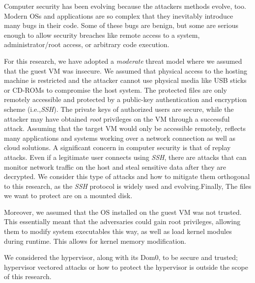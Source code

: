 Computer security has been evolving because the attackers methods evolve, too. Modern \acp{OS} and applications are so complex that they inevitably introduce many bugs in their code. Some of these bugs are benign, but some are serious enough to allow security breaches like remote access to a system, administrator/root access, or arbitrary code execution.

\par For this research, we have adopted a \emph{moderate} threat model where we assumed that the guest \ac{VM} was insecure. We assumed that physical access to the hosting machine is restricted and the attacker cannot use physical media like USB sticks or CD-ROMs to compromise the host system. The protected files are only remotely accessible and protected  by  a  public-key  authentication  and  encryption scheme (i.e.,\emph{SSH}). The  private  keys  of  authorized  users  are  secure, while the attacker may have obtained \emph{root} privileges on the \ac{VM} through a successful attack. Assuming that the target \ac{VM} would only be accessible remotely, reflects many applications and systems working over a network connection as well as cloud solutions. A significant  concern  in  computer security is that of replay attacks. Even if a legitimate user connects using \emph{SSH}, there are attacks that can monitor  network  traffic  on  the  host  and  steal  sensitive data after they are decrypted. We consider this type of attacks and how to mitigate them orthogonal to this research, as the \emph{SSH} protocol is widely used and evolving.Finally, The files we want to protect are on a mounted disk.

\par Moreover, we assumed that the \ac{OS} installed on the guest \ac{VM} was not trusted. This essentially meant that the adversaries could gain root privileges, allowing them to modify system executables this way, as well as load kernel modules during runtime. This allows for kernel memory modification.

\par We considered the hypervisor, along with its Dom0, to be secure and trusted; hypervisor vectored attacks or how to protect the hypervisor is outside the scope of this research.


